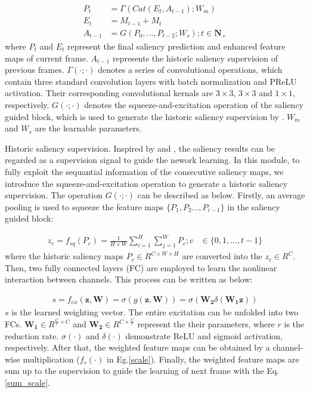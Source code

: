 \documentclass[12pt]{article}
\begin{document}
\begin{equation}
\label{enhance}
\begin{aligned}
   P_{t}  &= \Gamma(Cat(E_{t}, A_{t-1});W_m) \\
   E_{t}  &= M_{t-1} + M_{t} \\
   A_{t-1}  &= G(P_0, ..., P_{t-2};W_s); t \in \bm{N_{+}}
\end{aligned}
\end{equation} where $P_{t}$ and $E_{t}$ represent the final saliency prediction and enhanced feature maps of current frame. $A_{t-1}$ represents the historic saliency supervision of previous frames. $\Gamma(\cdot; \cdot)$ denotes a series of convolutional operations, which contain three standard convolution layers with batch normalization and PReLU activation. Their corresponding convolutional kernals are $3 \times 3 $, $3 \times 3$ and $1 \times 1$, respectively. $G(\cdot; \cdot)$ denotes the squeeze-and-excitation operation \cite{hu2018squeeze} of the saliency guided block, which is used to generate the historic saliency supervision by . $W_m$ and $W_s$ are the learnable parameters. 

Historic saliency supervision. Inspired by \cite{deng2018r3net} and \cite{wang2016saliency}, the saliency results can be regarded as a supervision signal to guide the nework learning. In this module, to fully exploit the sequantial information of the consecutive saliency maps, we introduce the squeeze-and-excitation operation to generate a historic saliency supervision. The operation $G(\cdot; \cdot)$ can be described as below. Firstly, an average pooling is used to squeeze the feature maps $\{P_1, P_2 ..., P_{i-1}\}$ in the saliency guided block: 

\begin{equation}
\label{sq}
\begin{aligned}
   z_{c} =f_{sq}(P_c) = \frac{1}{H \times W} \sum\limits_{i=1}^{H} \sum\limits_{j=1}^{W} P_c; c &\in \{0,1,...,t-1\}
 \end{aligned}
\end{equation} where the historic saliency maps $P_c \in R^{C \times W \times H}$ are converted into the $z_c \in R^{C}$. Then, two fully connected layers (FC) are employed to learn the nonlinear interaction between channels. This process can be written as below:

\begin{equation}
\label{ex}
\begin{aligned}
   s = f_{ex}(\bm{z}, \textbf{W}) = \sigma(g(\bm{z}, \bm{W})) = \sigma(\bm{W_2}\delta(\bm{W_1}\bm{z}))
 \end{aligned}
\end{equation} $s$ is the learned weighting vector. The entire excitation can be unfolded into two FCs. $\bm{W_1} \in R^{\frac{C}{r}\times C} $ and $\bm{W_2} \in R^{C\times \frac{C}{r}} $ represent the their parameters, where $r$ is the reduction rate. $\sigma(\cdot)$ and $\delta(\cdot)$ demonstrate ReLU and sigmoid activation, respectively. After that, the weighted feature maps can be obtained by a channel-wise multiplication ($f_{s}(\cdot)$ in Eg.\ref{scale}). Finally, the weighted feature maps are sum up to the supervision to guide the learning of next frame with the Eq.\ref{sum_scale}.
\end{document}
